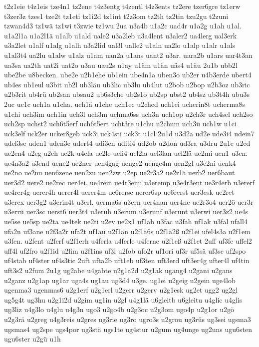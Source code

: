 {t2z1eie
t4z1eis
tze4n1
tz2ene
t4z3entg
t4zentl
t4z3ents
tz2ere
tzer6gre
tz1erw
t3zer3z
tzes1
tze2t
tz1eti
tz1i2d
tz1int
t2z3om
tz2th
tz2tin
tzu2gu
t2zuni
tzwan4d3
tz1wä
tz1wi
t3zwie
tz1wu
2ua
u3a4b
u1a2c
uad4r
u1a2g
u1ah
u1al.
u1a2l1a
u1a2l1ä
u1alb
u1ald
uale2
u3a2leb
u3a4lent
u3aler2
ua4lerg
ual3erk
u3a2let
u1alf
u1alg
u1alh
u3a2lid
ual3l
ualle2
u1aln
ua2lo
u1alp
u1alr
u1als
u1al3t4
ua2lu
u1alw
u1alz
u1am
uan2a
u1ans
uant2
u3ar.
uara2b
u1ars
uar4t3an
ua3sa
ua2th
uat2i
uat2o
u3au
uau2s
u1ay
u1äm
u1än
uäs4
u1äu
2u1b
ubb2l
ube2be
u8becken.
ube2e
u2b1ehe
ub1ein
ube4n1a
uben3o
ub2er
u4b3erde
ubert4
ub4es
ub1eul
u3bit
ub2l
ub3läu
ub3lic
ub3lu
ub4lut
u2bob
u2bop
u2b3oz
ub3ric
u2b3rit
ub4rü
ub2san
ubsau2
ub6s3che
ub2s1o
ub2sp
ubst2
ub4sz
ub3t4h
ubu3s
2uc
uc1c
uch1a
u1cha.
uch1ä
u1che
uch1ec
u2ched
uch1ei
ucherin8t
ucherma8s
u1chi
uch3im
uch1in
uch3l
uch3m
uchma6ss
uch3n
uch1op
u2ch3r
uch4sel
uch2so
uch2sp
uchst2
uch6t5erf
uch6t5ert
ucht3re
u1chu
u2chum
uch3ü
uch1w
u1ci
uck3elf
uck2er
ucker8geb
uck3i
uck4sti
uck3t
u1cl
2u1d
u3d2a
ud2e
ude3i4
udein7
udel3se
uden1
uden3e
udert4
udi3en
uditi4
ud2ob
u2don
ud3ra
u3dru
2u1e
u2ed
ue2en4
u2eg
u2eh
ue2k
u4ela
ue2le
ueli4
uel2la
uel3lan
uel2lä
ue2mi
uen1
u3en.
ue4n3a2
u3end
uene2
ue2ner
uen4gag
uenge2
uenge4m
uen2gl
u3e2ni
uenk4
ue2no
ue2nu
uen6zene
uen2zu
uen2zw
u2ep
ue2r3a2
ue2r1ä
uerb2
uer6baut
uer3d2
uere2
ue2rec
uer4ei.
ue4rein
ue4r3emi
u3eremp
u3e4r3ent
ue3r4erb
u3ererf
ue4rer4g
uerer4h
uerer4l
uerer4m
ue6rersc
uerer6sp
ue6rerst
uer3esk
ue2ret
u3erex
uer3g2
u3erin4t
u3erl.
uerma6s
u3ern
uer4nan
uer4ne
ue2r3o4
uer2ö
uer3r
u3errü
uer3sc
uerst6
uer3t4
u3eruh
u3erum
u3erunf
u3erunt
u3erwi
uer3z2
ue4s
ue5se
ue5sp
ue2ta
ue4tek
ue2ti
u2ev
ue2x1
uf1ab
u3fac
u3fah
uf1ak
u3fal
ufall4
ufa2n
uf3ane
u2f3a2r
ufa2t
uf1au
u2f1än
u2f1ä6s
u2f1ä2ß
u2f1ei
ufel4s3a
u2f1em
u3fen.
u2fent
u2ferf
u2f1erh
u4ferla
u4ferle
u4ferne
u2f1eß
u2f1et
2uff
uf3fe
uffel2
uff4l
uf2fro
u2f1id
u2fim
u2f1ins
uf3l
u2fob
ufo2r
uf1ori
uf3r
uf5sä
uf3sc
uf2spo
uf4stab
uf4ster
uf4s3tic
2uft
ufta2b
uft1eb
uf3ten
uft3erd
uft3er4g
ufter4l
uf4tin
uft3s2
u2fum
2u1g
ug2abe
u4gabte
u2g1a2d
u2g1ak
ugang4
u2gani
u2gans
u2ganz
u2g1ap
ug1ar
uga4s
ug1au
ug3d4
u3ge.
ug1ei
u2geig
u2gein
uge4lob
ugenma3
ugenmas6
u2g1erf
u2g1erl
u2gerr
u2gerv
u2g1esk
ug2et
ugg2
ug2gl
ug5g4t
ug3hu
u2g1i2d
u2gim
ug1in
u2gl
u4g1lä
u6gleitb
u6gleitu
u4glic
u4glis
ug3liz
u4g3lo
u4glu
u4g3n
ugo3
u2go4b
u2g3oc
u2g3om
ugo4p
u2g1or
u2gö
u2g3rä
u2greg
u4g3reis
u2gres
ug3rie
ug3ro
ugro3s
u2grou
ug3rüs
ug3sei
ugsma3
ugsmas4
ug2spe
ugs4por
ug3stä
ugs1te
ug4stur
u2gum
ug4unge
ug2uns
ugu6sten
ugu6ster
u2gü
u1h
}
